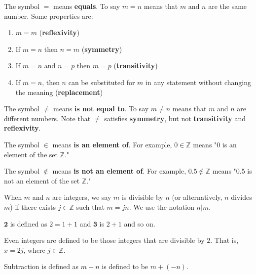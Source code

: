 The symbol $\boldsymbol{=}$ means \textbf{equals}. To say $m = n$ means that $m$ and $n$ are the same number. Some properties are:
\begin{enumerate}[label=\roman*.]
  \item $\mathit{m = m}$ \hfill (\textbf{reflexivity})
  \item If $\mathit{m = n}$ then $\mathit{n = m}$ \hfill (\textbf{symmetry})
  \item If $\mathit{m = n}$ and $\mathit{n = p}$ then $\mathit{m = p}$ \hfill (\textbf{transitivity})
  \item If $\mathit{m = n}$, then $n$ can be substituted for $m$ in any statement without changing the meaning \hfill (\textbf{replacement})
\end{enumerate}

The symbol $\boldsymbol{\neq}$ means \textbf{is not equal to}. To say $\mathit{m \neq n}$ means that $m$ and $n$ are different numbers. Note that $\boldsymbol{\neq}$ satisfies \textbf{symmetry}, but not \textbf{transitivity} and \textbf{reflexivity}.

The symbol $\boldsymbol{\in}$ means \textbf{is an element of}. For example, $0 \in \mathbb{Z}$ means "0 is an element of the set $\mathbb{Z}$."

The symbol $\boldsymbol{\notin}$ means \textbf{is not an element of}. For example, $0.5 \notin \mathbb{Z}$ means "0.5 is not an element of the set $\mathbb{Z}$."

When $m$ and $n$ are integers, we say $m$ is divisible by $n$ (or alternatively, $n$ divides $m$) if there exists $j \in \mathbb{Z}$ such that $m = jn$. We use the notation $n|m$.

$\boldsymbol{2}$ is defined as $2 = 1+1$ and $\boldsymbol{3}$ is $2+1$ and so on.

Even integers are defined to be those integers that are divisible by $2$. That is, $x = 2j$, where $j \in \mathbb{Z}$.

Subtraction is defined as $m - n$ is defined to be $m + (-n)$.

